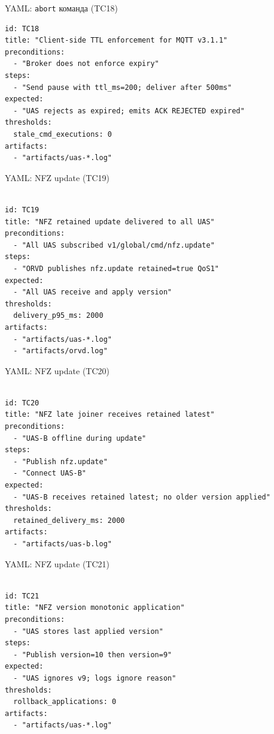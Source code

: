 \documentclass[aspectratio=169]{beamer}
\begin{document}
\begin{frame}[fragile]{YAML: \texttt{abort} команда (TC18)}
\begin{Verbatim}[fontsize=\scriptsize, baselinestretch=0.85]
id: TC18
title: "Client-side TTL enforcement for MQTT v3.1.1"
preconditions:
  - "Broker does not enforce expiry"
steps:
  - "Send pause with ttl_ms=200; deliver after 500ms"
expected:
  - "UAS rejects as expired; emits ACK REJECTED expired"
thresholds:
  stale_cmd_executions: 0
artifacts:
  - "artifacts/uas-*.log"

\end{Verbatim}
\end{frame}

\begin{frame}[fragile]{YAML: NFZ update (TC19)}
\begin{Verbatim}[fontsize=\scriptsize, baselinestretch=0.85]

id: TC19
title: "NFZ retained update delivered to all UAS"
preconditions:
  - "All UAS subscribed v1/global/cmd/nfz.update"
steps:
  - "ORVD publishes nfz.update retained=true QoS1"
expected:
  - "All UAS receive and apply version"
thresholds:
  delivery_p95_ms: 2000
artifacts:
  - "artifacts/uas-*.log"
  - "artifacts/orvd.log"

\end{Verbatim}
\end{frame}

\begin{frame}[fragile]{YAML: NFZ update (TC20)}
\begin{Verbatim}[fontsize=\scriptsize, baselinestretch=0.85]

id: TC20
title: "NFZ late joiner receives retained latest"
preconditions:
  - "UAS-B offline during update"
steps:
  - "Publish nfz.update"
  - "Connect UAS-B"
expected:
  - "UAS-B receives retained latest; no older version applied"
thresholds:
  retained_delivery_ms: 2000
artifacts:
  - "artifacts/uas-b.log"

\end{Verbatim}
\end{frame}

\begin{frame}[fragile]{YAML: NFZ update (TC21)}
\begin{Verbatim}[fontsize=\scriptsize, baselinestretch=0.85]

id: TC21
title: "NFZ version monotonic application"
preconditions:
  - "UAS stores last applied version"
steps:
  - "Publish version=10 then version=9"
expected:
  - "UAS ignores v9; logs ignore reason"
thresholds:
  rollback_applications: 0
artifacts:
  - "artifacts/uas-*.log"

\end{Verbatim}
\end{frame}
\end{document}

